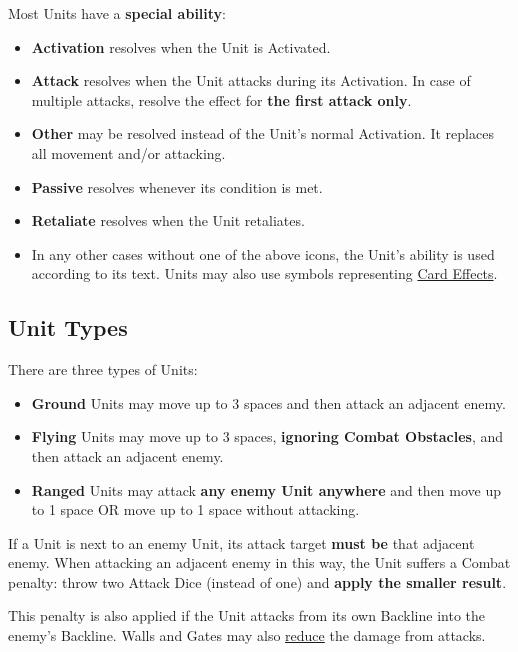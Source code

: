 \begin{multicols}{2}
Most Units have a \textbf{special ability}:\par
\begin{itemize}[wide]
  \item\textbf{Activation}  resolves when the Unit is Activated.
  \item\textbf{Attack}  resolves when the Unit attacks during its Activation.
    In case of multiple attacks, resolve the effect for \textbf{the first attack only}.
  \item\textbf{Other}  may be resolved instead of the Unit's normal Activation.
    It replaces all movement and/or attacking.
  \item\textbf{Passive}  resolves whenever its condition is met.
  \item\textbf{Retaliate}  resolves when the Unit retaliates.
  \item In any other cases without one of the above icons, the Unit's ability is used according to its text.
    Units may also use symbols representing \hyperlink{Card Effects}{Card Effects}.
\end{itemize}

\vspace*{\fill}

\columnbreak

\subsection*{\hypertarget{Unittype}{Unit Types}}
There are three types of Units:
\begin{itemize}
  \item \textbf{Ground}  Units may move up to 3 spaces and then attack an adjacent enemy.
  \item \textbf{Flying}  Units may move up to 3 spaces, \textbf{ignoring Combat Obstacles}, and then attack an adjacent enemy.
  \item \textbf{Ranged}  Units may attack \textbf{any enemy Unit anywhere} and then move up to 1 space OR move up to 1 space without attacking.
\end{itemize}
If a  Unit is next to an enemy Unit, its attack target \textbf{must be} that adjacent enemy.
When attacking an adjacent enemy in this way, the  Unit suffers a Combat penalty: throw two Attack Dice (instead of one) and \textbf{apply the smaller result}.\par
This penalty is also applied if the  Unit attacks from its own Backline into the enemy's Backline.
Walls and Gates may also \hyperlink{Walls}{reduce} the damage from   attacks.


\end{multicols}
